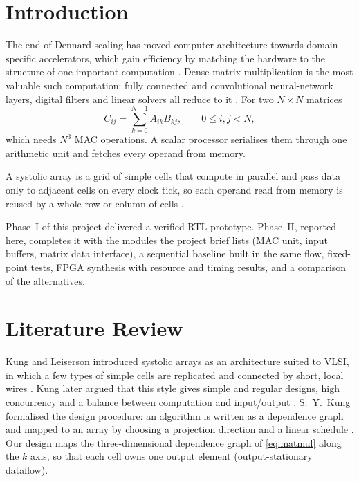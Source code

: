 \documentclass[conference]{IEEEtran}
\begin{document}
\section{Introduction}
The end of Dennard scaling has moved computer architecture towards
domain-specific accelerators, which gain efficiency by matching the hardware to
the structure of one important computation \cite{hennessy}. Dense matrix
multiplication is the most valuable such computation: fully connected and
convolutional neural-network layers, digital filters and linear solvers all
reduce to it \cite{sze}. For two $N \times N$ matrices
\begin{equation}
C_{ij} = \sum_{k=0}^{N-1} A_{ik} B_{kj}, \qquad 0 \le i,j < N,
\label{eq:matmul}
\end{equation}
which needs $N^3$ MAC operations. A scalar processor serialises them through one
arithmetic unit and fetches every operand from memory.

A systolic array is a grid of simple cells that compute in parallel and pass
data only to adjacent cells on every clock tick, so each operand read from
memory is reused by a whole row or column of cells \cite{kung1982}.

Phase~I of this project delivered a verified RTL prototype. Phase~II, reported
here, completes it with the modules the project brief lists (MAC unit, input
buffers, matrix data interface), a sequential baseline built in the same flow,
fixed-point tests, FPGA synthesis with resource and timing results, and a
comparison of the alternatives.

\section{Literature Review}
Kung and Leiserson introduced systolic arrays as an architecture suited to
VLSI, in which a few types of simple cells are replicated and connected by
short, local wires \cite{kungleiserson}. Kung later argued that this style gives
simple and regular designs, high concurrency and a balance between computation
and input/output \cite{kung1982}. S.~Y.~Kung formalised the design procedure: an
algorithm is written as a dependence graph and mapped to an array by choosing a
projection direction and a linear schedule \cite{sykung}. Our design maps the
three-dimensional dependence graph of \eqref{eq:matmul} along the $k$ axis, so
that each cell owns one output element (output-stationary dataflow).
\end{document}
